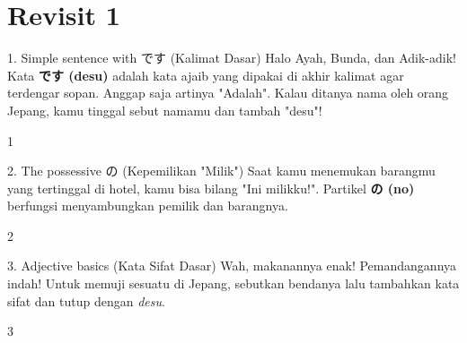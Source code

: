 ﻿\chapter{Revisit 1}

\begin{lessonbox}{1. Simple sentence with です (Kalimat Dasar)}
    Halo Ayah, Bunda, dan Adik-adik! Kata \textbf{です (desu)} adalah kata ajaib yang dipakai di akhir kalimat agar terdengar sopan. Anggap saja artinya "Adalah". Kalau ditanya nama oleh orang Jepang, kamu tinggal sebut namamu dan tambah "desu"!
\end{lessonbox}
\begin{convobox}{1}
    \noindent
      
     

    \vspace{1.5em}
\end{convobox}

\begin{lessonbox}{2. The possessive の (Kepemilikan "Milik")}
    Saat kamu menemukan barangmu yang tertinggal di hotel, kamu bisa bilang "Ini milikku!". Partikel \textbf{の (no)} berfungsi menyambungkan pemilik dan barangnya.
\end{lessonbox}
\begin{convobox}{2}
    \noindent
      
     

    \vspace{1.5em}
\end{convobox}

\begin{lessonbox}{3. Adjective basics (Kata Sifat Dasar)}
    Wah, makanannya enak! Pemandangannya indah! Untuk memuji sesuatu di Jepang, sebutkan bendanya lalu tambahkan kata sifat dan tutup dengan \textit{desu}.
\end{lessonbox}
\begin{convobox}{3}
    \noindent
       
     

    \vspace{1.5em}
\end{convobox}

